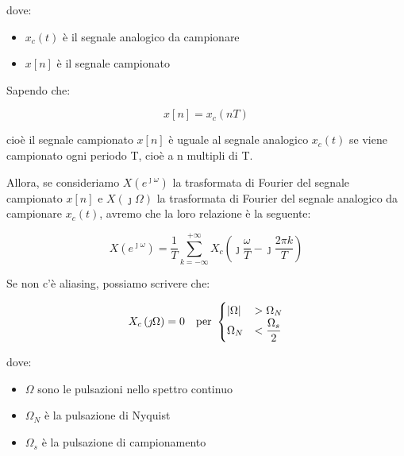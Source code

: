 dove: 

\begin{itemize}
    \item $x_c \left(t\right)$ è il segnale analogico da campionare 
    \item $x \left[ n\right]$ è il segnale campionato
\end{itemize}

Sapendo che: 

{
    \Large 
    \begin{equation}
        x \left[n\right] = x_c \left(n T\right)
    \end{equation}
}

cioè il segnale campionato $x \left[n\right]$ è uguale al segnale analogico $x_c (t)$ 
se viene campionato ogni periodo T, cioè a n multipli di T. \newline 

Allora, 
se consideriamo $X \left(e^{\jmath \omega}\right)$ la trasformata di Fourier del segnale campionato $x \left[n\right]$ 
e $X \left(\jmath \Omega\right)$ la trasformata di Fourier del segnale analogico da campionare $x_c (t)$, 
avremo che la loro relazione è la seguente: 

{
    \Large 
    \begin{equation}
        X \left(e^{\jmath \omega}\right) 
        = 
        \dfrac{1}{T} 
        \sum_{k = -\infty}^{+ \infty}
        X_c \left(\jmath \dfrac{\omega}{T} - \jmath \dfrac{2 \pi k}{T}\right)
    \end{equation}
}

Se non c'è aliasing, possiamo scrivere che: 

{
    \Large 
    \begin{equation}
        \setlength{\jot}{10pt} %
        X_c \left(\jmath \Omega\right) = 0 
        \quad
        \text{per }
        \begin{cases}
        \abs{\Omega} &> \Omega_N 
        \\
        \Omega_N &< \dfrac{\Omega_s}{2}
        \end{cases}
    \end{equation}
}

dove: 

\begin{itemize}
    \item $\Omega$ sono le pulsazioni nello spettro continuo 
    \item $\Omega_N$ è la pulsazione di Nyquist 
    \item $\Omega_s$ è la pulsazione di campionamento
\end{itemize}

